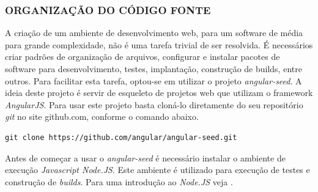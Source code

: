 \subsubsection{ORGANIZAÇÃO DO CÓDIGO FONTE}
A criação de um ambiente de desenvolvimento web, para um software de média para grande complexidade, não é uma tarefa trivial de ser resolvida.
É necessários criar padrões de organização de arquivos, configurar e instalar pacotes de software para desenvolvimento, testes, implantação, construção de builds, entre outros.
Para facilitar esta tarefa, optou-se em utilizar o projeto \emph{angular-seed}.
A ideia deste projeto é servir de esqueleto de projetos web que utilizam o framework \emph{AngularJS}.
Para usar este projeto basta cloná-lo diretamente do seu repositório \emph{git} no site github.com, conforme o comando abaixo.
\lstset{language=bash}
\begin{lstlisting}[frame=single]
git clone https://github.com/angular/angular-seed.git
\end{lstlisting}

Antes de começar a usar o \emph{angular-seed} é necessário instalar o ambiente de execução \emph{Javascript Node.JS}. Este ambiente é utilizado para execução de testes e construção de \emph{builds}. Para uma introdução ao \emph{Node.JS} veja \cite{Syed2014}.

